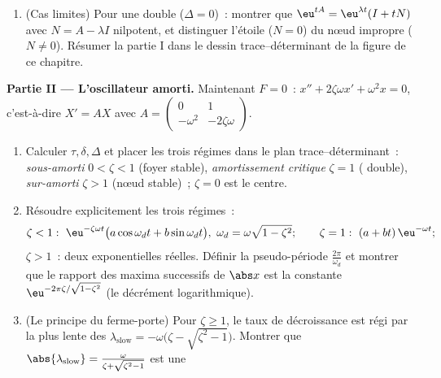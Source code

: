 \begin{problem}
\begin{enumerate}
        réel, admis dans cette généralité ou démontré pour les
        systèmes de la partie II, qui sont ceux utilisés
        ci-dessous) pour décrire les orbites~: des spirales
        convergeant pour $\alpha = \frac\tau2 < 0$, divergeant
        pour $\tau > 0$, des courbes fermées (centre) pour $\tau
        = 0$.
  \item (Cas limites) Pour une  double ($\Delta =
        0$)~: montrer que $\eu^{tA} = \eu^{\lambda t}(I + tN)$
        avec $N = A - \lambda I$ nilpotent, et distinguer
        l'étoile ($N = 0$) du nœud impropre ($N \neq 0$).
        Résumer la partie I dans le dessin trace--déterminant de
        la figure de ce chapitre.
\end{enumerate}

\medskip
\noindent\textbf{Partie II --- L'oscillateur amorti.} Maintenant $F
= 0$~: $x'' + 2\zeta\omega x' + \omega^2x = 0$, c'est-à-dire $X' =
AX$ avec $A = \begin{pmatrix} 0 & 1\\ -\omega^2 &
-2\zeta\omega\end{pmatrix}$.
\begin{enumerate}[resume]
  \item Calculer $\tau, \delta, \Delta$ et placer les trois
        régimes dans le plan trace--déterminant~:
        \emph{sous-amorti} $0 < \zeta < 1$ (foyer stable),
        \emph{amortissement critique} $\zeta = 1$ (
        double), \emph{sur-amorti} $\zeta > 1$ (nœud stable)~;
        $\zeta = 0$ est le centre.
  \item Résoudre explicitement les trois régimes~:
        \[
        \zeta < 1:\ \eu^{-\zeta\omega t}\bigl(a\cos\omega_d t
        + b\sin\omega_dt\bigr),\ \omega_d =
        \omega\sqrt{1-\zeta^2};
        \qquad
        \zeta = 1:\ (a + bt)\,\eu^{-\omega t};
        \]
        $\zeta > 1$~: deux exponentielles réelles. Définir la
        pseudo-période $\frac{2\pi}{\omega_d}$ et montrer que
        le rapport des maxima successifs de $\abs x$ est la
        constante $\eu^{-2\pi\zeta/\sqrt{1-\zeta^2}}$ (le
        décrément logarithmique).
  \item (Le principe du ferme-porte) Pour $\zeta \geq 1$, le
        taux de décroissance est régi par la plus lente des
         $\lambda_{\mathrm{slow}} = -\omega\bigl(\zeta -
        \sqrt{\zeta^2-1}\bigr)$. Montrer que
        $\abs{\lambda_{\mathrm{slow}}} =
        \frac{\omega}{\zeta + \sqrt{\zeta^2 - 1}}$ est une

\end{enumerate}
\end{problem}
